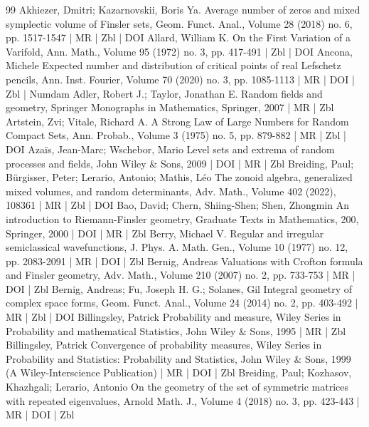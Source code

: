 \begin{thebibliography}{99}
Akhiezer, Dmitri; Kazarnovskii, Boris Ya. Average number of zeros and mixed symplectic volume of Finsler sets, Geom. Funct. Anal., Volume 28 (2018) no. 6, pp. 1517-1547 | MR | Zbl | DOI
Allard, William K. On the First Variation of a Varifold, Ann. Math., Volume 95 (1972) no. 3, pp. 417-491 | Zbl | DOI
Ancona, Michele Expected number and distribution of critical points of real Lefschetz pencils, Ann. Inst. Fourier, Volume 70 (2020) no. 3, pp. 1085-1113 | MR | DOI | Zbl | Numdam
Adler, Robert J.; Taylor, Jonathan E. Random fields and geometry, Springer Monographs in Mathematics, Springer, 2007 | MR | Zbl
Artstein, Zvi; Vitale, Richard A. A Strong Law of Large Numbers for Random Compact Sets, Ann. Probab., Volume 3 (1975) no. 5, pp. 879-882 | MR | Zbl | DOI
Azaïs, Jean-Marc; Wschebor, Mario Level sets and extrema of random processes and fields, John Wiley \& Sons, 2009 | DOI | MR | Zbl
Breiding, Paul; Bürgisser, Peter; Lerario, Antonio; Mathis, Léo The zonoid algebra, generalized mixed volumes, and random determinants, Adv. Math., Volume 402 (2022), 108361 | MR | Zbl | DOI
Bao, David; Chern, Shiing-Shen; Shen, Zhongmin An introduction to Riemann-Finsler geometry, Graduate Texts in Mathematics, 200, Springer, 2000 | DOI | MR | Zbl
Berry, Michael V. Regular and irregular semiclassical wavefunctions, J. Phys. A. Math. Gen., Volume 10 (1977) no. 12, pp. 2083-2091 | MR | DOI | Zbl
Bernig, Andreas Valuations with Crofton formula and Finsler geometry, Adv. Math., Volume 210 (2007) no. 2, pp. 733-753 | MR | DOI | Zbl
Bernig, Andreas; Fu, Joseph H. G.; Solanes, Gil Integral geometry of complex space forms, Geom. Funct. Anal., Volume 24 (2014) no. 2, pp. 403-492 | MR | Zbl | DOI
Billingsley, Patrick Probability and measure, Wiley Series in Probability and mathematical Statistics, John Wiley \& Sons, 1995 | MR | Zbl
Billingsley, Patrick Convergence of probability measures, Wiley Series in Probability and Statistics: Probability and Statistics, John Wiley \& Sons, 1999 (A Wiley-Interscience Publication) | MR | DOI | Zbl
Breiding, Paul; Kozhasov, Khazhgali; Lerario, Antonio On the geometry of the set of symmetric matrices with repeated eigenvalues, Arnold Math. J., Volume 4 (2018) no. 3, pp. 423-443 | MR | DOI | Zbl

\end{thebibliography}
